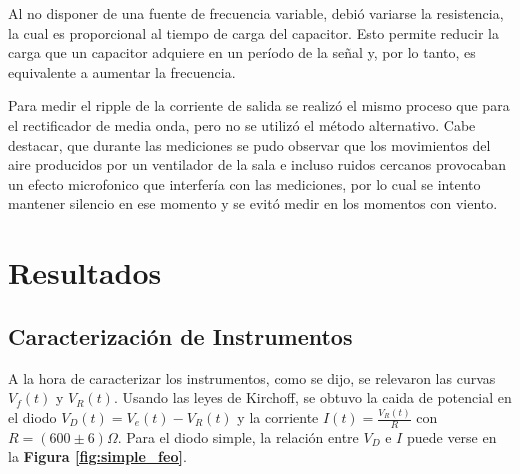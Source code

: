 \documentclass[11pt,a4paper]{article}
\begin{document}
Al no disponer de una fuente de frecuencia variable, debió variarse la resistencia, la cual es proporcional al tiempo de carga del capacitor. Esto permite reducir la carga que un capacitor adquiere en un período de la señal y, por lo tanto, es equivalente a aumentar la frecuencia. 

Para medir el ripple de la corriente de salida se realizó el mismo proceso que para el rectificador de media onda, pero no se utilizó el método alternativo. Cabe destacar, que durante las mediciones se pudo observar que los movimientos del aire producidos por un ventilador de la sala e incluso ruidos cercanos provocaban un efecto microfonico que interfería con las mediciones, por lo cual se intento mantener silencio en ese momento y se evitó medir en los momentos con viento.



\section{Resultados}
\label{sec:discusion}

\subsection{Caracterización de Instrumentos}

A la hora de caracterizar los instrumentos, como se dijo, se relevaron las curvas $V_f(t)$ y $V_R(t)$. Usando las leyes de Kirchoff, se obtuvo la caida de potencial en el diodo $V_D(t) = V_e(t)-V_R(t)$ y la corriente $I(t) = \frac{V_R(t)}{R}$ con $R = (600 \pm 6)\Omega$. Para el diodo simple, la relación entre $V_D$ e $I$ puede verse en la \textbf{Figura \ref{fig:simple_feo}}.
\end{document}
